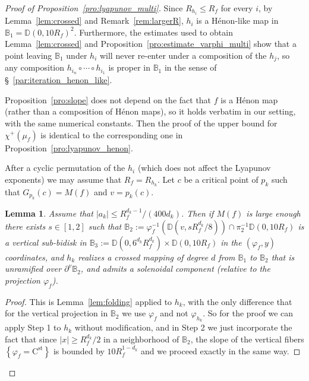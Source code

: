 \documentclass[oneside, 12pt]{amsart}
\newcommand{\disk}{\mathbb{D}}
\newcommand{\fr}{\partial}
\newcommand{\set}[1]{\left\{#1\right\}}
\newcommand{\abs}[1]{\left\vert#1\right\vert}
\newcommand{\cst}{\mathrm{C}^\mathrm{st}}
\newcommand{\inv}{^{-1}}
\newcommand{\bb}{\mathbb{B}}
\theoremstyle{plain}
\newtheorem{lem}[thm]{Lemma}
\theoremstyle{definition}
\numberwithin{equation}{section}       %
\numberwithin{equation}{section}       %
\begin{document}
 
\begin{proof}[Proof of Proposition~\ref{pro:lyapunov_multi}] 
Since $R_{h_i}\leq R_f$ for every $i$, by Lemma~\ref{lem:crossed} and Remark~\ref{rem:largerR}, 
$h_i$ is a Hénon-like map in 
$\bb_1 = \disk(0, 10R_f)^2$.
Furthermore, the estimates used to obtain  Lemma~\ref{lem:crossed}
and   Proposition~\ref{pro:estimate_varphi_multi}
 show that a point leaving $\bb_1$ under $h_i$ will never re-enter under a composition of the $h_j$, so any composition $h_{i_n}\circ\cdots \circ h_{i_1}$ is proper in $\bb_1$ in the sense of \S~\ref{par:iteration_henon_like}. 

Proposition~\ref{pro:slope} does not depend on the fact that $f$ is a Hénon map (rather than a composition of Hénon maps), 
so it holds verbatim in our setting, with  the same numerical constants. 
Then  the proof of  the upper bound for $\chi^+(\mu_f)$ is identical to the corresponding one in Proposition~\ref{pro:lyapunov_henon}.

After  a cyclic permutation of the $h_i$ (which does not affect the Lyapunov exponents)
we may assume that $R_f = R_{h_k}$. Let $c$ be a critical point  of $p_k$ such that 
$G_{p_k}(c) =  M(f)$ and $v=p_k(c)$. 

\begin{lem}
\label{lem:folding2}
Assume   that $\abs{a_k}\leq     R_f^{d_k-1}/(400d_k)$. 
Then if $M(f)$ is  large enough  there exists $s\in [1, 2]$ such     
that  $\bb_2:= \varphi_f\inv (\disk(v, sR_f^{d_k}/8)) \cap \pi_2\inv \disk(0, 10 R_f)$ 
is a vertical sub-bidisk in $\bb_3:=\disk(0, 6^{d_k}R_f^{d_k})\times \disk(0, 10R_f)$ 
 in  the $(\varphi_f, y)$ coordinates, 
and $h_k$ realizes a crossed mapping of degree $d$ from $\bb_1$ to $\bb_2$ that is unramified over $\fr^v\bb_2$, and admits a solenoidal component 
 (relative to the projection $\varphi_f$).   
\end{lem}

\begin{proof}
This is Lemma~\ref{lem:folding} applied to $h_k$, 
with the only difference that for the vertical projection in $\bb_2$ we use $\varphi_f$ and not $\varphi_{h_k}$.
So for the proof we can apply Step 1 to $h_k$ without modification, 
and in Step 2 we just incorporate the fact that  since  $\abs{x}\geq R_f^{d_k}/2$ in a neighborhood of $\bb_2$,   
the   slope  of the vertical fibers $\set{\varphi_f = \cst}$ is  bounded by $10 R_f^{1-d_k}$   and we proceed exactly in the same way. 
\end{proof}


\end{proof}
\end{document}
